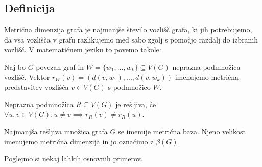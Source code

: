 \documentclass[mat1, tisk]{fmfdelo}
\begin{document}
\subsection{Definicija} \label{ss:definicija_metricne_dim_grafa}

Metrična dimenzija grafa je najmanjše število vozlišč grafa, ki jih potrebujemo, da
vsa vozlišča v grafu razlikujemo med sabo zgolj s pomočjo razdalj do izbranih vozlišč.
V matematičnem jeziku to povemo takole:

\begin{definicija} \label{def:metricna_predstavitev}
    Naj bo $G$ povezan graf in $W = \{ w_1, ... , w_k  \} \subseteq V(G)$ neprazna 
    podmnožica vozlišč. Vektor $r_W(v) = (d(v, w_1), ..., d(v, w_k))$ imenujemo metrična 
    predstavitev vozlišča $v \in V(G)$ s podmnožico $W$.
\end{definicija}

\begin{definicija} \label{def:resljiva_mn}
    Neprazna podmnožica $R \subseteq V(G)$ je rešljiva,
    če $\forall u, v \in V(G): u \neq v \implies r_R(v) \neq r_R(u)$.
\end{definicija}

\begin{definicija} \label{def:baza_dimenzija}
    Najmanjša rešljiva množica grafa $G$ se imenuje metrična baza. Njeno velikost imenujemo 
    metrična dimenzija in jo označimo z $\beta(G).$ 
\end{definicija}

Poglejmo si nekaj lahkih osnovnih primerov.
\end{document}

